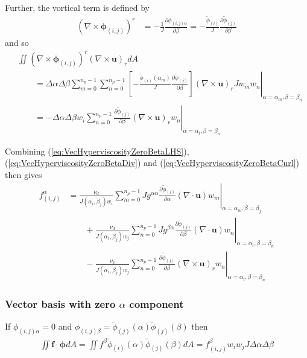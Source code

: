 \documentclass{article}
\newcommand{\vb}{\mathbf}
\newcommand{\vg}{\boldsymbol}
\newcommand{\pdiff}[2]{\frac{\partial #1}{\partial #2}}
\begin{document}
Further, the vortical term is defined by
\begin{align}
(\nabla \times \vg{\phi}_{(i,j)})^r &= - \frac{1}{J} \pdiff{\phi_{(i,j) \alpha}}{\beta} = - \frac{\tilde{\phi}_{(i)}}{J} \pdiff{\tilde{\phi}_{(j)}}{\beta}
\end{align} and so
\begin{align}
& \iint (\nabla \times \vg{\phi}_{(i,j)})^r (\nabla \times \vb{u})_r dA \nonumber \\
& \qquad = \Delta \alpha \Delta \beta \sum_{m=0}^{n_p-1} \sum_{n=0}^{n_p-1} \left. \left[- \frac{\tilde{\phi}_{(i)}(\alpha_m)}{J} \pdiff{\tilde{\phi}_{(j)}}{\beta} \right] (\nabla \times \vb{u})_r J w_m w_n \right\vert_{\alpha = \alpha_m, \beta = \beta_n} \\
& \qquad = - \Delta \alpha \Delta \beta w_i \sum_{n=0}^{n_p-1} \left. \pdiff{\tilde{\phi}_{(j)}}{\beta} (\nabla \times \vb{u})_r w_n \right\vert_{\alpha = \alpha_i, \beta = \beta_n} \label{eq:VecHyperviscosityZeroBetaCurl}
\end{align}

Combining (\ref{eq:VecHyperviscosityZeroBetaLHS}), (\ref{eq:VecHyperviscosityZeroBetaDiv}) and (\ref{eq:VecHyperviscosityZeroBetaCurl}) then gives
\begin{align}
f^\alpha_{(i,j)} &= \frac{\nu_d}{J(\alpha_i, \beta_j) w_i} \sum_{m = 0}^{n_p-1} \left. J g^{\alpha \alpha} \pdiff{\tilde{\phi}_{(i)}}{\alpha} (\nabla \cdot \vb{u}) w_m \right\vert_{\alpha = \alpha_m, \beta = \beta_j} \nonumber \\
& \qquad + \frac{\nu_d}{J(\alpha_i, \beta_j) w_j} \sum_{n = 0}^{n_p-1} \left. J g^{\beta \alpha} \pdiff{\tilde{\phi}_{(j)}}{\beta} (\nabla \cdot \vb{u}) w_n \right\vert_{\alpha = \alpha_i, \beta = \beta_n} \nonumber \\
& \qquad - \frac{\nu_v}{J(\alpha_i, \beta_j) w_j} \sum_{n=0}^{n_p-1} \left. \pdiff{\tilde{\phi}_{(j)}}{\beta} (\nabla \times \vb{u})_r w_n \right\vert_{\alpha = \alpha_i, \beta = \beta_n}
\end{align}

\subsubsection{Vector basis with zero $\alpha$ component}

If $\phi_{(i,j) \alpha} = 0$ and $\phi_{(i,j) \beta} = \tilde{\phi}_{(j)}(\alpha) \tilde{\phi}_{(j)}(\beta)$ then
\begin{align} \label{eq:VecHyperviscosityZeroAlphaLHS}
\iint \vb{f} \cdot \vb{\phi} dA = \iint f^\beta \tilde{\phi}_{(i)}(\alpha) \tilde{\phi}_{(j)}(\beta) dA = f^\beta_{(i,j)} w_i w_j J \Delta \alpha \Delta \beta
\end{align}
\end{document}
